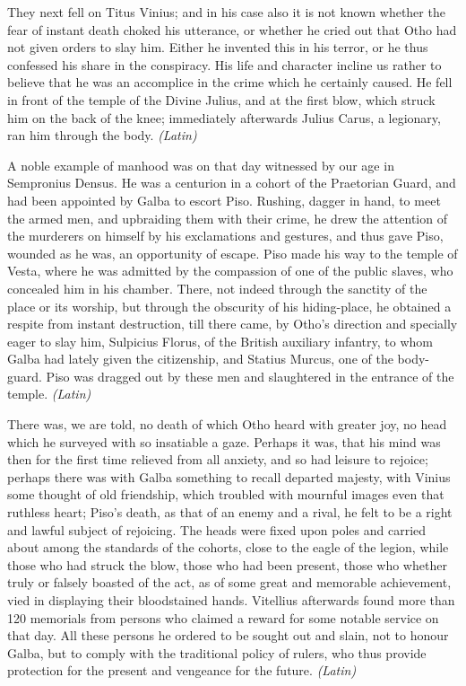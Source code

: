 
They next fell on Titus Vinius; and in his case also it is not known whether the fear of instant death choked his utterance, or whether he cried out that Otho had not given orders to slay him. Either he invented this in his terror, or he thus confessed his share in the conspiracy. His life and character incline us rather to believe that he was an accomplice in the crime which he certainly caused. He fell in front of the temple of the Divine Julius, and at the first blow, which struck him on the back of the knee; immediately afterwards Julius Carus, a legionary, ran him through the body. \emph{(Latin)}


A noble example of manhood was on that day witnessed by our age in Sempronius Densus. He was a centurion in a cohort of the Praetorian Guard, and had been appointed by Galba to escort Piso. Rushing, dagger in hand, to meet the armed men, and upbraiding them with their crime, he drew the attention of the murderers on himself by his exclamations and gestures, and thus gave Piso, wounded as he was, an opportunity of escape. Piso made his way to the temple of Vesta, where he was admitted by the compassion of one of the public slaves, who concealed him in his chamber. There, not indeed through the sanctity of the place or its worship, but through the obscurity of his hiding-place, he obtained a respite from instant destruction, till there came, by Otho's direction and specially eager to slay him, Sulpicius Florus, of the British auxiliary infantry, to whom Galba had lately given the citizenship, and Statius Murcus, one of the body-guard. Piso was dragged out by these men and slaughtered in the entrance of the temple. \emph{(Latin)}


There was, we are told, no death of which Otho heard with greater joy, no head which he surveyed with so insatiable a gaze. Perhaps it was, that his mind was then for the first time relieved from all anxiety, and so had leisure to rejoice; perhaps there was with Galba something to recall departed majesty, with Vinius some thought of old friendship, which troubled with mournful images even that ruthless heart; Piso's death, as that of an enemy and a rival, he felt to be a right and lawful subject of rejoicing. The heads were fixed upon poles and carried about among the standards of the cohorts, close to the eagle of the legion, while those who had struck the blow, those who had been present, those who whether truly or falsely boasted of the act, as of some great and memorable achievement, vied in displaying their bloodstained hands. Vitellius afterwards found more than 120 memorials from persons who claimed a reward for some notable service on that day. All these persons he ordered to be sought out and slain, not to honour Galba, but to comply with the traditional policy of rulers, who thus provide protection for the present and vengeance for the future. \emph{(Latin)}

